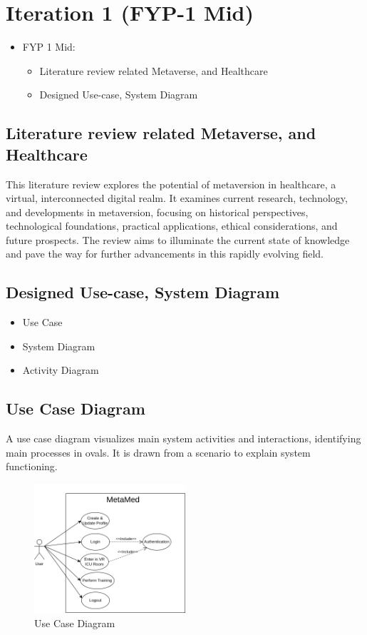 \chapter{Iteration 1 (FYP-1 Mid)}
\label{ch:iter1}
\begin{itemize}
    \item FYP 1 Mid: 
    \begin{itemize}
    \item Literature review related Metaverse, and Healthcare
    \item Designed Use-case, System Diagram
    \end{itemize}
\end{itemize}


\section{Literature review related Metaverse, and Healthcare}
{This literature review explores the potential of metaversion in healthcare, a virtual, interconnected digital realm. It examines current research, technology, and developments in metaversion, focusing on historical perspectives, technological foundations, practical applications, ethical considerations, and future prospects. The review aims to illuminate the current state of knowledge and pave the way for further advancements in this rapidly evolving field.
}

\section{Designed Use-case, System Diagram}
\begin{itemize}
    \item Use Case 
    \item System Diagram
    \item Activity Diagram
\end{itemize}


\section{Use Case Diagram}
A use case diagram visualizes main system activities and interactions, identifying main processes in ovals. It is drawn from a scenario to explain system functioning.
\begin{figure}[h]
    \centering
    \includegraphics[width=0.5\textwidth, height=0.3\textheight]{Images/Use Case.drawio.png}
    \caption{Use Case Diagram}
    \label{fig:system-diagram}
\end{figure}


